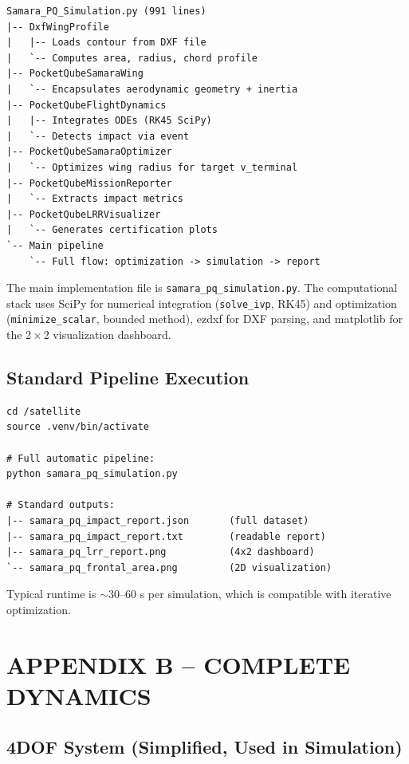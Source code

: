 \documentclass[12pt,a4paper]{article}
\begin{document}
\begin{verbatim}
Samara_PQ_Simulation.py (991 lines)
|-- DxfWingProfile
|   |-- Loads contour from DXF file
|   `-- Computes area, radius, chord profile
|-- PocketQubeSamaraWing
|   `-- Encapsulates aerodynamic geometry + inertia
|-- PocketQubeFlightDynamics
|   |-- Integrates ODEs (RK45 SciPy)
|   `-- Detects impact via event
|-- PocketQubeSamaraOptimizer
|   `-- Optimizes wing radius for target v_terminal
|-- PocketQubeMissionReporter
|   `-- Extracts impact metrics
|-- PocketQubeLRRVisualizer
|   `-- Generates certification plots
`-- Main pipeline
    `-- Full flow: optimization -> simulation -> report
\end{verbatim}

The main implementation file is \texttt{samara\_pq\_simulation.py}. The computational stack uses SciPy for numerical integration (\texttt{solve\_ivp}, RK45) and optimization (\texttt{minimize\_scalar}, bounded method), ezdxf for DXF parsing, and matplotlib for the 2\,$\times$\,2 visualization dashboard.

\subsection{Standard Pipeline Execution}

\begin{verbatim}
cd /satellite
source .venv/bin/activate

# Full automatic pipeline:
python samara_pq_simulation.py

# Standard outputs:
|-- samara_pq_impact_report.json       (full dataset)
|-- samara_pq_impact_report.txt        (readable report)
|-- samara_pq_lrr_report.png           (4x2 dashboard)
`-- samara_pq_frontal_area.png         (2D visualization)
\end{verbatim}

Typical runtime is $\sim$30--60 s per simulation, which is compatible with iterative optimization.

\vspace{0.5em}

\section{APPENDIX B -- COMPLETE DYNAMICS}
\label{sec:appendix-dynamics}

\subsection{4DOF System (Simplified, Used in Simulation)}
\end{document}

